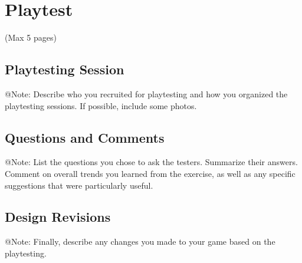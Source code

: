 \chapter{Playtest}

\begin{TempText}
	(Max 5 pages)
\end{TempText}


\section{Playtesting Session}

\begin{TempText}
	@Note: Describe who you recruited for playtesting and how you organized the playtesting sessions. If possible, include some photos.
\end{TempText}


\section{Questions and Comments}

\begin{TempText}
	@Note: List the questions you chose to ask the testers. Summarize their answers. Comment on overall trends you learned from the exercise, as well as any specific suggestions that were particularly useful.
\end{TempText}


\section{Design Revisions}

\begin{TempText}
	@Note: Finally, describe any changes you made to your game based on the playtesting.
\end{TempText}

